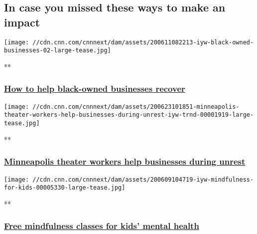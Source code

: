 \hypertarget{in-case-you-missed-these-ways-to-make-an-impact-}{%
\subsection{In case you missed these ways to make an
impact~}\label{in-case-you-missed-these-ways-to-make-an-impact-}}

\href{/videos/us/2020/06/10/iyw-how-to-help-black-owned-businesses-recover.cnn}{}

\texttt{[image: //cdn.cnn.com/cnnnext/dam/assets/200611082213-iyw-black-owned-businesses-02-large-tease.jpg]}

**

\hypertarget{how-to-help-black-owned-businesses-recover}{%
\subsubsection{\texorpdfstring{\href{/videos/us/2020/06/10/iyw-how-to-help-black-owned-businesses-recover.cnn}{How
to help black-owned businesses
recover}}{How to help black-owned businesses recover}}\label{how-to-help-black-owned-businesses-recover}}

\href{/videos/us/2020/06/23/minneapolis-theater-workers-help-businesses-during-unrest-iyw-trnd.cnn}{}

\texttt{[image: //cdn.cnn.com/cnnnext/dam/assets/200623101851-minneapolis-theater-workers-help-businesses-during-unrest-iyw-trnd-00001919-large-tease.jpg]}

**

\hypertarget{minneapolis-theater-workers-help-businesses-during-unrest-}{%
\subsubsection{\texorpdfstring{\href{/videos/us/2020/06/23/minneapolis-theater-workers-help-businesses-during-unrest-iyw-trnd.cnn}{Minneapolis
theater workers help businesses during unrest
}}{Minneapolis theater workers help businesses during unrest }}\label{minneapolis-theater-workers-help-businesses-during-unrest-}}

\href{/videos/world/2020/06/09/iyw-mindfulness-for-kids.cnn}{}

\texttt{[image: //cdn.cnn.com/cnnnext/dam/assets/200609104719-iyw-mindfulness-for-kids-00005330-large-tease.jpg]}

**

\hypertarget{free-mindfulness-classes-for-kids-mental-health-}{%
\subsubsection{\texorpdfstring{\href{/videos/world/2020/06/09/iyw-mindfulness-for-kids.cnn}{Free
mindfulness classes for kids' mental health
}}{Free mindfulness classes for kids' mental health }}\label{free-mindfulness-classes-for-kids-mental-health-}}

